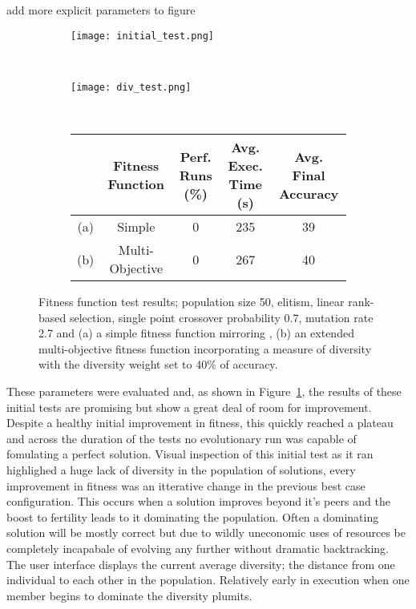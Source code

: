 \todo add more explicit parameters to figure
\begin{figure}
	\centering
	\begin{subfigure}[ht]{0.49\textwidth}
		\texttt{[image: initial\_test.png]}
		\caption{}
		\label{fig:initial}
		\vspace{1em}
	\end{subfigure}
	~
	\begin{subfigure}[ht]{0.49\textwidth}
		\texttt{[image: div\_test.png]}
		\caption{}
		\label{fig:initial_div}
		\vspace{1em}
	\end{subfigure}
	~
	\begin{subfigure}[ht]{\textwidth}
		\centering
		\begin{tabular}{ccccc}
			\toprule
			& \bfseries{Fitness Function} &
			\bfseries{Perf. Runs (\%)} &
			\bfseries{Avg. Exec. Time (s)} & \bfseries{Avg. Final Accuracy}\\
			\midrule
			(a) & Simple & 0 & 235 & 39\\
			(b) & Multi-Objective & 0 & 267 & 40\\
			\bottomrule
		\end{tabular}
	\end{subfigure}

	\caption[Fitness function test results]{Fitness function test results;
		population size 50, elitism, linear rank-based selection, single point
		crossover probability 0.7, mutation rate 2.7 and
		(a) a simple fitness function mirroring \cite{10.1007/3-540-63173-9_61},
		(b) an extended multi-objective fitness function incorporating a measure
		of diversity with the diversity weight set to 40\% of accuracy.}
\end{figure}

These parameters were evaluated and, as shown in Figure~\ref{fig:initial},
the results of these initial tests are
promising but show a great deal of room for improvement. Despite a healthy
initial improvement in fitness, this quickly reached a plateau and
across the duration of the tests no evolutionary run was
capable of fomulating a perfect solution.
Visual inspection of this initial test as it ran highlighed a huge lack of
diversity in the population of solutions, every improvement in fitness was
an itterative change in the previous best case configuration. This occurs
when a solution improves beyond it's peers and the boost to fertility leads to
it dominating the population. Often a dominating solution will be mostly
correct but due to wildly uneconomic uses of resources be completely incapabale
of evolving any further without dramatic backtracking. The user interface displays
the current average diversity; the distance from one individual to each other in the
population. Relatively early in execution when one member begins to dominate the
diversity plumits.

